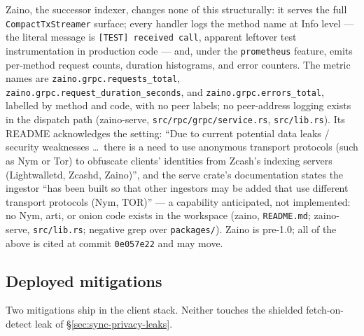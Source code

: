 \documentclass[11pt,a4paper]{article}
\theoremstyle{definition}
\begin{document}
Zaino, the successor indexer, changes none of this structurally: it serves
the full \texttt{CompactTxStreamer} surface; every handler logs the method
name
at Info level --- the literal message is \texttt{[TEST] received call},
apparent leftover test instrumentation in production code --- and, under
the \texttt{prometheus} feature, emits per-method request counts, duration
histograms, and error counters. The metric names are
\texttt{zaino.grpc.requests\_total},
\texttt{zaino.grpc.request\_duration\_seconds}, and
\texttt{zaino.grpc.errors\_total}, labelled by method and code, with no
peer labels; no peer-address logging exists in the dispatch path
(\textsf{zaino-serve}, \texttt{src/rpc/grpc/service.rs},
\texttt{src/lib.rs}). Its README acknowledges the
setting: ``Due to current potential data leaks / security weaknesses
\ldots\ there is a need to use anonymous transport protocols (such as Nym
or Tor) to obfuscate clients' identities from Zcash's indexing servers
(Lightwalletd, Zcashd, Zaino)'', and the serve crate's documentation states
the ingestor ``has been built so that other ingestors may be added that use
different transport protocols (Nym, TOR)'' --- a capability anticipated,
not implemented: no Nym, arti, or onion code exists in the workspace
(\textsf{zaino}, \texttt{README.md}; \textsf{zaino-serve},
\texttt{src/lib.rs}; negative grep over \texttt{packages/}). Zaino is
pre-1.0; all of the above
is cited at commit \texttt{0e057e22} and may move.

\subsection{Deployed mitigations}\label{sec:sync-privacy-mitigations}

Two mitigations ship in the client stack. Neither touches the shielded
fetch-on-detect leak of \S\ref{sec:sync-privacy-leaks}.
\end{document}
